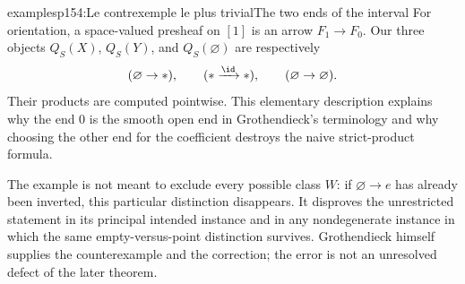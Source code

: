 \begin{dcomment}{examples}{p154:Le contrexemple le plus trivial}{The two ends of the interval}
For orientation, a space-valued presheaf on $[1]$ is an arrow $F_1\to F_0$. Our three objects $Q_S(X)$, $Q_S(Y)$, and $Q_S(\varnothing)$ are respectively
\[
 (\varnothing\to *),\qquad(*\xrightarrow{\id}*),\qquad
 (\varnothing\to\varnothing).
\]
Their products are computed pointwise. This elementary description explains why the end $0$ is the smooth open end in Grothendieck's terminology and why choosing the other end for the coefficient destroys the naive strict-product formula.

The example is not meant to exclude every possible class $W$: if $\varnothing\to e$ has already been inverted, this particular distinction disappears. It disproves the unrestricted statement in its principal intended instance and in any nondegenerate instance in which the same empty-versus-point distinction survives. Grothendieck himself supplies the counterexample and the correction; the error is not an unresolved defect of the later theorem.
\end{dcomment}

